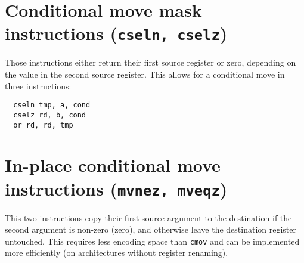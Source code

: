 
\section{Conditional move mask instructions (\texttt{cseln, cselz})}

Those instructions either return their first source register or zero, depending on the
value in the second source register. This allows for a conditional move in three instructions:

\begin{verbatim}
  cseln tmp, a, cond
  cselz rd, b, cond
  or rd, rd, tmp
\end{verbatim}




\section{In-place conditional move instructions (\texttt{mvnez, mveqz})}

This two instructions copy their first source argument to the destination if the second
argument is non-zero (zero), and otherwise leave the destination register untouched.
This requires less encoding space than \texttt{cmov} and can be implemented more
efficiently (on architectures without register renaming).
